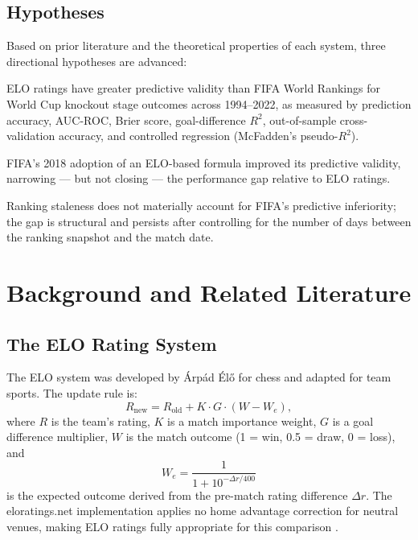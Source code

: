 \documentclass[12pt, a4paper]{article}
\begin{document}
\subsection{Hypotheses}

Based on prior literature and the theoretical properties of each system, three directional
hypotheses are advanced:

\begin{description}[leftmargin=2em, labelwidth=1.8em]
  \item[\textbf{H1}] ELO ratings have greater predictive validity than FIFA World Rankings for
  World Cup knockout stage outcomes across 1994--2022, as measured by prediction accuracy,
  AUC-ROC, Brier score, goal-difference $R^{2}$, out-of-sample cross-validation accuracy,
  and controlled regression (McFadden's pseudo-$R^{2}$).

  \item[\textbf{H2}] FIFA's 2018 adoption of an ELO-based formula improved its predictive
  validity, narrowing --- but not closing --- the performance gap relative to ELO ratings.

  \item[\textbf{H3}] Ranking staleness does not materially account for FIFA's predictive
  inferiority; the gap is structural and persists after controlling for the number of days
  between the ranking snapshot and the match date.
\end{description}

\section{Background and Related Literature}

\subsection{The ELO Rating System}

The ELO system was developed by Árpád Élő for chess \cite{eloarp1978} and adapted for team sports.
The update rule is:
\[
  R_{\text{new}} = R_{\text{old}} + K \cdot G \cdot (W - W_e),
\]
where $R$ is the team's rating, $K$ is a match importance weight, $G$ is a goal difference
multiplier, $W$ is the match outcome (1 = win, 0.5 = draw, 0 = loss), and
\[
  W_e = \frac{1}{1 + 10^{-\Delta r / 400}}
\]
is the expected outcome derived from the pre-match rating difference $\Delta r$. The
eloratings.net implementation applies no home advantage correction for neutral venues, making
ELO ratings fully appropriate for this comparison \cite{eloratings2024}.
\end{document}
